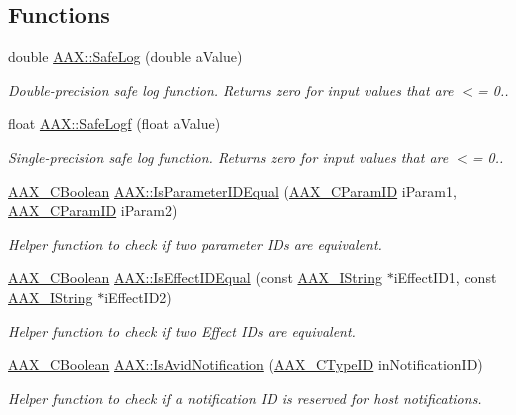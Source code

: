 \subsection*{Functions}
\begin{DoxyCompactItemize}
\item 
double \mbox{\hyperlink{a00852_ae8de30637f08cd29bb0e27526ce9e21b}{A\+A\+X\+::\+Safe\+Log}} (double a\+Value)
\begin{DoxyCompactList}\small\item\em Double-\/precision safe log function. Returns zero for input values that are $<$= 0.. \end{DoxyCompactList}\item 
float \mbox{\hyperlink{a00852_ad762727aac31ad8b7bba8b67a4bc2edc}{A\+A\+X\+::\+Safe\+Logf}} (float a\+Value)
\begin{DoxyCompactList}\small\item\em Single-\/precision safe log function. Returns zero for input values that are $<$= 0.. \end{DoxyCompactList}\item 
\mbox{\hyperlink{a00392_aa216506530f1d19a2965931ced2b274b}{A\+A\+X\+\_\+\+C\+Boolean}} \mbox{\hyperlink{a00852_ae4d1a0a925aa954899fec653dc041b75}{A\+A\+X\+::\+Is\+Parameter\+I\+D\+Equal}} (\mbox{\hyperlink{a00392_a1440c756fe5cb158b78193b2fc1780d1}{A\+A\+X\+\_\+\+C\+Param\+ID}} i\+Param1, \mbox{\hyperlink{a00392_a1440c756fe5cb158b78193b2fc1780d1}{A\+A\+X\+\_\+\+C\+Param\+ID}} i\+Param2)
\begin{DoxyCompactList}\small\item\em Helper function to check if two parameter I\+Ds are equivalent. \end{DoxyCompactList}\item 
\mbox{\hyperlink{a00392_aa216506530f1d19a2965931ced2b274b}{A\+A\+X\+\_\+\+C\+Boolean}} \mbox{\hyperlink{a00852_aef81989128dcac01f2be8fd25096540f}{A\+A\+X\+::\+Is\+Effect\+I\+D\+Equal}} (const \mbox{\hyperlink{a01873}{A\+A\+X\+\_\+\+I\+String}} $\ast$i\+Effect\+I\+D1, const \mbox{\hyperlink{a01873}{A\+A\+X\+\_\+\+I\+String}} $\ast$i\+Effect\+I\+D2)
\begin{DoxyCompactList}\small\item\em Helper function to check if two Effect I\+Ds are equivalent. \end{DoxyCompactList}\item 
\mbox{\hyperlink{a00392_aa216506530f1d19a2965931ced2b274b}{A\+A\+X\+\_\+\+C\+Boolean}} \mbox{\hyperlink{a00852_ab63efd791ab1cbbcdb004302b106c45c}{A\+A\+X\+::\+Is\+Avid\+Notification}} (\mbox{\hyperlink{a00392_ac678f9c1fbcc26315d209f71a147a175}{A\+A\+X\+\_\+\+C\+Type\+ID}} in\+Notification\+ID)
\begin{DoxyCompactList}\small\item\em Helper function to check if a notification ID is reserved for host notifications. \end{DoxyCompactList}\end{DoxyCompactItemize}


